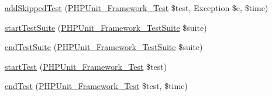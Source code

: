 \begin{DoxyCompactItemize}
\item 
\mbox{\hyperlink{class_p_h_p_unit___text_u_i___result_printer_a1c0cb3bc58e5807530daf3a93783ed4e}{add\+Skipped\+Test}} (\mbox{\hyperlink{interface_p_h_p_unit___framework___test}{P\+H\+P\+Unit\+\_\+\+Framework\+\_\+\+Test}} \$test, Exception \$e, \$time)
\item 
\mbox{\hyperlink{class_p_h_p_unit___text_u_i___result_printer_a901a86a623d83184267b21f2daee0ff5}{start\+Test\+Suite}} (\mbox{\hyperlink{class_p_h_p_unit___framework___test_suite}{P\+H\+P\+Unit\+\_\+\+Framework\+\_\+\+Test\+Suite}} \$suite)
\item 
\mbox{\hyperlink{class_p_h_p_unit___text_u_i___result_printer_aeec28a4d1328434916ebcdc1ca6b5527}{end\+Test\+Suite}} (\mbox{\hyperlink{class_p_h_p_unit___framework___test_suite}{P\+H\+P\+Unit\+\_\+\+Framework\+\_\+\+Test\+Suite}} \$suite)
\item 
\mbox{\hyperlink{class_p_h_p_unit___text_u_i___result_printer_a1a9bddc54f26bb3fb5c2ec9778ea5198}{start\+Test}} (\mbox{\hyperlink{interface_p_h_p_unit___framework___test}{P\+H\+P\+Unit\+\_\+\+Framework\+\_\+\+Test}} \$test)
\item 
\mbox{\hyperlink{class_p_h_p_unit___text_u_i___result_printer_a6de65eea8b294795cbc34c4c8cee8546}{end\+Test}} (\mbox{\hyperlink{interface_p_h_p_unit___framework___test}{P\+H\+P\+Unit\+\_\+\+Framework\+\_\+\+Test}} \$test, \$time)
\end{DoxyCompactItemize}
